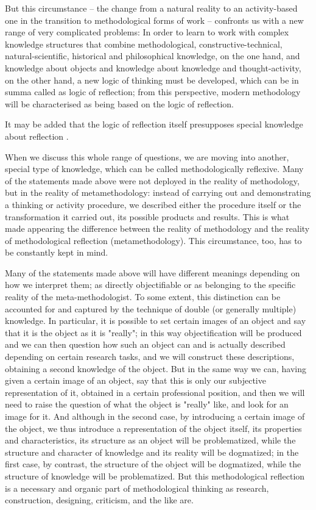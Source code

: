 \documentclass[11pt,a4paper]{article}
\begin{document}
But this circumstance – the change from a natural reality to an activity-based
one in the transition to methodological forms of work – confronts us with a
new range of very complicated problems: In order to learn to work with complex
knowledge structures that combine methodological, constructive-technical,
natural-scientific, historical and philosophical knowledge, on the one hand,
and knowledge about objects and knowledge about knowledge and
thought-activity, on the other hand, a new logic of thinking must be
developed, which can be in summa called as logic of reflection; from this
perspective, modern methodology will be characterised as being based on the
logic of reflection.

It may be added that the logic of reflection itself presupposes special
knowledge about reflection \cite[pp. 131-143]{Elaboration1975}.

When we discuss this whole range of questions, we are moving into another,
special type of knowledge, which can be called methodologically reflexive.
Many of the statements made above were not deployed in the reality of
methodology, but in the reality of metamethodology: instead of carrying out
and demonstrating a thinking or activity procedure, we described either the
procedure itself or the transformation it carried out, its possible products
and results. This is what made appearing the difference between the reality of
methodology and the reality of methodological reflection (metamethodology).
This circumstance, too, has to be constantly kept in mind.

Many of the statements made above will have different meanings depending on
how we interpret them; as directly objectifiable or as belonging to the
specific reality of the meta-methodologist. To some extent, this distinction
can be accounted for and captured by the technique of double (or generally
multiple) knowledge. In particular, it is possible to set certain images of an
object and say that it is the object as it is "really"; in this way
objectification will be produced and we can then question how such an object
can and is actually described depending on certain research tasks, and we will
construct these descriptions, obtaining a second knowledge of the object. But
in the same way we can, having given a certain image of an object, say that
this is only our subjective representation of it, obtained in a certain
professional position, and then we will need to raise the question of what the
object is "really" like, and look for an image for it. And although in the
second case, by introducing a certain image of the object, we thus introduce a
representation of the object itself, its properties and characteristics, its
structure as an object will be problematized, while the structure and
character of knowledge and its reality will be dogmatized; in the first case,
by contrast, the structure of the object will be dogmatized, while the
structure of knowledge will be problematized. But this methodological
reflection is a necessary and organic part of methodological thinking as
research, construction, designing, criticism, and the like are.
\end{document}
